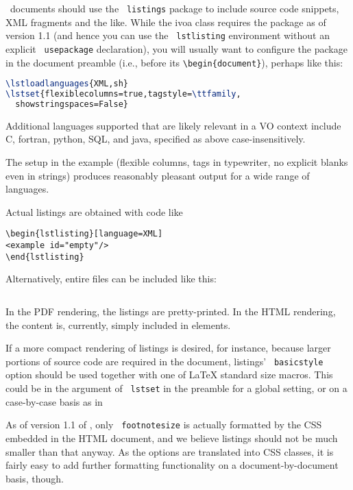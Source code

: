 \documentclass[11pt,a4paper]{ivoa}
\newcommand{\texword}[1]{\texttt{\color{texcolor} #1}}
\begin{document}
\ivoatex\ documents should use the \texword{listings} package to include
source code snippets, XML fragments and the like.  While the ivoa class
requires the package as of version 1.1 (and hence you can use the
\texword{lstlisting} environment without an explicit
\texword{usepackage} declaration), you will usually want to configure
the package in the document preamble (i.e., before its
\verb|\begin{document}|), perhaps like this:

\begin{lstlisting}[language=TeX]
\lstloadlanguages{XML,sh}
\lstset{flexiblecolumns=true,tagstyle=\ttfamily,
  showstringspaces=False}
\end{lstlisting}

Additional
languages supported that are likely relevant in a VO context include C,
fortran, python, SQL, and java, specified as above case-insensitively.

The setup in the example (flexible columns, tags in
typewriter, no explicit blanks even in strings) 
produces reasonably pleasant output for a wide range of languages.

Actual listings are obtained with code like
\begin{verbatim}
\begin{lstlisting}[language=XML]
<example id="empty"/>
\end{lstlisting}
\end{verbatim}
Alternatively, entire files can be included like this:
\begin{verbatim}

\end{verbatim}
In the PDF rendering, the listings are pretty-printed.  In the HTML
rendering, the content is, currently, simply included in  elements.

If a more compact rendering of listings is desired, for instance,
because larger portions of source code are required in the document,
listings' \texword{basicstyle} option should be used together with one
of LaTeX standard size macros.  This could be in the argument of
\texword{lstset} in the preamble for a global setting, or on a
case-by-case basis as in



As of version 1.1 of \ivoatex, only \texword{footnotesize} is actually
formatted by the CSS embedded in the HTML document, and we believe
listings should not be much smaller than that anyway.  As the options
are translated into CSS classes, it is fairly easy to add further
formatting functionality on a document-by-document basis, though.
\end{document}
